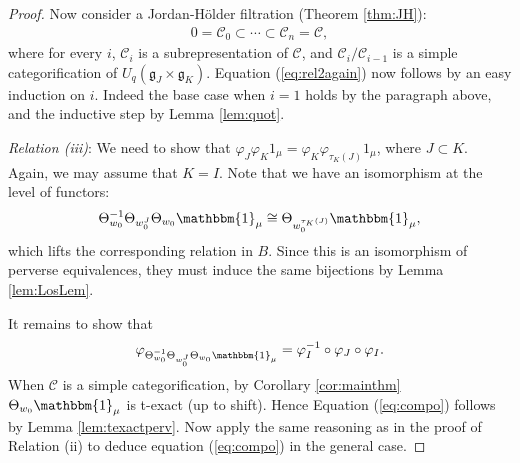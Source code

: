 \documentclass[11pt,reqno]{amsart}
\numberwithin{equation}{section}
\theoremstyle{definition}
\theoremstyle{named}
\newcommand{\cC}{\mathcal{C}}
\newcommand{\cL}{\mathcal{L}}
\newcommand{\fg}{\mathfrak{g}}
\newcommand{\kk}{\mathbbm{k}}
\newcommand{\oded}[1]{\textcolor{red}{$[\star$ Oded: #1 $\star]$}}
\newcommand{\bone}{\mathbbm{1}}
\newcommand{\Hom}{\operatorname{Hom}}
\begin{document}
\begin{proof}
Now consider a Jordan-H\"older filtration (Theorem \ref{thm:JH}):
\begin{align*}
0=\cC_0\subset \cdots\subset \cC_n=\cC,
\end{align*}
where for every $i$, $\cC_i$ is a  subrepresentation of $\cC$, and $\cC_i/\cC_{i-1}$ is a simple categorification of $U_q(\fg_J\times\fg_K)$.  Equation (\ref{eq:rel2again}) now follows by an easy induction on $i$.
Indeed the base case when $i=1$ holds by the paragraph above, and the inductive step by Lemma \ref{lem:quot}.



\textit{Relation (iii)}: We need to show that $\varphi_J\varphi_K1_\mu=\varphi_K\varphi_{\tau_K(J)}1_\mu$, where $J\subset K$.  Again, we may assume that $K=I$.  Note that we have an isomorphism at the level of functors:
\begin{align*}
\Theta_{w_0}^{-1}\Theta_{w_0^J}\Theta_{w_0}\bone_\mu \cong \Theta_{w_0^{\tau_K(J)}}\bone_\mu,
\end{align*}
which lifts the corresponding relation in $B$.  Since this is an isomorphism of perverse equivalences, they must induce the same bijections by Lemma \ref{lem:LosLem}.  

It remains to show that 
\begin{align}\label{eq:compo}
\varphi_{\Theta_{w_0}^{-1}\Theta_{w_0^J}\Theta_{w_0}\bone_\mu} =\varphi_I^{-1}\circ \varphi_J\circ \varphi_I.
\end{align}
When $\cC$ is a simple categorification, by Corollary \ref{cor:mainthm} $\Theta_{w_0}\bone_\mu$ is t-exact (up to shift).  Hence Equation (\ref{eq:compo}) follows by Lemma \ref{lem:texactperv}.  Now apply the same reasoning as in the proof of Relation (ii) to deduce equation (\ref{eq:compo}) in the general case.  



\end{proof}
\end{document}
